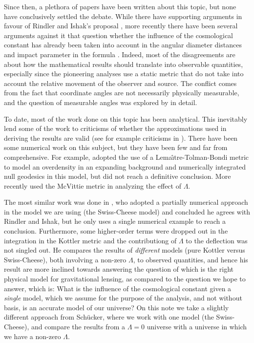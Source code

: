 Since then, a plethora of papers have been written about this topic, but none have conclusively settled the debate. While there have supporting arguments in favour of Rindler and Ishak's proposal \citep{sereno2008influence,bhadra2010gravitational,schucker2008strong}, more recently there have been several arguments against it that question whether the influence of the cosmological constant has already been taken into account in the angular diameter distances and impact parameter in the formula \citep{butcher2016no,piattella2016lensing,arakida2012effect}. Indeed, most of the disagreements are about how the mathematical results should translate into observable quantities, especially since the pioneering analyses use a static metric that do not take into account the relative movement of the observer and source. The conflict comes from the fact that coordinate angles are not necessarily physically measurable, and the question of measurable angles was explored by \citet{lebedev2013influence} in detail. 

To date, most of the work done on this topic has been analytical. This inevitably lend some of the work to criticisms of whether the approximations used in deriving the results are valid (see for example criticisms in \citet{ishak2010more}). There have been some numerical work on this subject, but they have been few and far from comprehensive. For example, \citet{beynon2012testing} adopted the use of a Lema{\^\i}tre-Tolman-Bondi metric to model an overdensity in an expanding background and numerically integrated null geodesics in this model, but did not reach a definitive conclusion. More recently \citep{aghili2017effect} used the McVittie metric \citep{mcvittie1933mass} in analyzing the effect of $\Lambda$. 

The most similar work was done in \citet{schucker2009strong}, who adopted a partially numerical approach in the model we are using (the Swiss-Cheese model) and concluded he agrees with Rindler and Ishak, but he only uses a single numerical example to reach a conclusion. Furthermore, some higher-order terms were dropped out in the integration in the Kottler metric and the contributiong of $\Lambda$ to the deflection was not singled out. He compares the results of \emph{different} models (pure Kottler versus Swiss-Cheese), both involving a non-zero $\Lambda$, to observed quantities, and hence his result are more inclined towards answering the question of which is the right physical model for gravitational lensing, as compared to the question we hope to answer, which is: What is the influence of the cosmological constant given a \emph{single} model, which we assume for the purpose of the analysis, and not without basis, is an accurate model of our universe? On this note we take a slightly different approach from Sch{\"u}cker, where we work with one model (the Swiss-Cheese), and compare the results from a $\Lambda = 0$ universe with a universe in which we have a non-zero $\Lambda$. 

